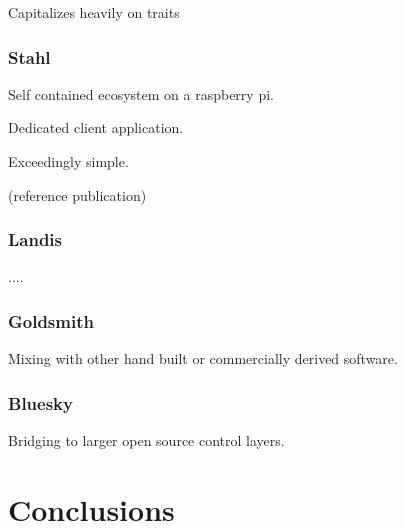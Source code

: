 \documentclass{article}
\begin{document}
Capitalizes heavily on traits

\subsubsection{Stahl}

Self contained ecosystem on a raspberry pi.

Dedicated client application.

Exceedingly simple.

(reference publication)

\subsubsection{Landis}

....

\subsubsection{Goldsmith}

Mixing with other hand built or commercially derived software.

\subsubsection{Bluesky}

Bridging to larger open source control layers.

\section{Conclusions}
\end{document}
